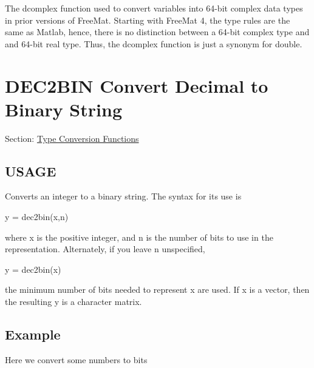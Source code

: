 The {\ttfamily dcomplex} function used to convert variables into 64-\/bit complex data types in prior versions of Free\-Mat. Starting with Free\-Mat 4, the type rules are the same as Matlab, hence, there is no distinction between a 64-\/bit complex type and and 64-\/bit real type. Thus, the {\ttfamily dcomplex} function is just a synonym for {\ttfamily double}. \hypertarget{typecast_dec2bin}{}\section{D\-E\-C2\-B\-I\-N Convert Decimal to Binary String}\label{typecast_dec2bin}
Section\-: \hyperlink{sec_typecast}{Type Conversion Functions} \hypertarget{typecast_dec2bin_USAGE}{}\subsection{U\-S\-A\-G\-E}\label{typecast_dec2bin_USAGE}
Converts an integer to a binary string. The syntax for its use is \begin{DoxyVerb}   y = dec2bin(x,n)
\end{DoxyVerb}
 where {\ttfamily x} is the positive integer, and {\ttfamily n} is the number of bits to use in the representation. Alternately, if you leave {\ttfamily n} unspecified, \begin{DoxyVerb}   y = dec2bin(x)
\end{DoxyVerb}
 the minimum number of bits needed to represent {\ttfamily x} are used. If {\ttfamily x} is a vector, then the resulting {\ttfamily y} is a character matrix. \hypertarget{variables_struct_Example}{}\subsection{Example}\label{variables_struct_Example}
Here we convert some numbers to bits


